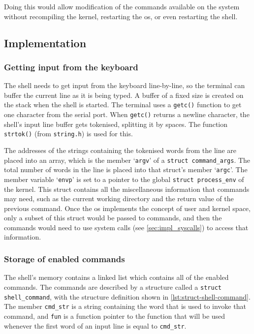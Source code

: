 \documentclass{article}
\begin{document}
Doing this would allow modification of the commands available on the system
without recompiling the kernel, restarting the \gls{os}, or even restarting the
shell.


\subsection{Implementation}
\subsubsection{Getting input from the keyboard}
The shell needs to get input from the keyboard line-by-line, so the terminal
can buffer the current line as it is being typed. A buffer of a fixed size is
created on the stack when the shell is started. The terminal uses a
\texttt{getc()} function to get one character from the serial port. When
\texttt{getc()} returns a newline character, the shell's input line buffer gets
tokenised, splitting it by spaces. The function \texttt{strtok()} (from
\texttt{string.h}) is used for this.

The addresses of the strings containing the tokenised words from the line are
placed into an array, which is the member `\texttt{argv}' of a \texttt{struct
command\_args}. The total number of words in the line is placed into that
struct's member `\texttt{argc}'. The member variable `\texttt{envp}' is set to
a pointer to the global \texttt{struct process\_env} of the kernel. This struct
contains all the miscellaneous information that commands may need, such as the
current working directory and the return value of the previous command. Once
the \gls{os} implements the concept of user and kernel space, only a subset of
this struct would be passed to commands, and then the commands would need to
use system calls (see \autoref{sec:impl_syscalls}) to access that information.

\subsubsection{Storage of enabled commands}
The shell's memory contains a linked list which contains all of the enabled
commands. The commands are described by a structure called a \texttt{struct
shell\_command}, with the structure definition shown in
\autoref{lst:struct-shell-command}. The member \verb!cmd_str! is a string
containing the word that is used to invoke that command, and \verb!fun! is a
function pointer to the function that will be used whenever the first word of
an input line is equal to \verb!cmd_str!.
\end{document}
